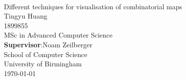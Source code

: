 




 


\begin{titlepage}
	\mbox{}\vspace{5\baselineskip}\\
	\sffamily\huge
	\centering
	Different techniques for visualisation of combinatorial maps
	\vspace{3\baselineskip}\\
	\rmfamily\Large
	Tingyu Huang \\ 1899855\\MSc in Advanced Computer Science
	\vspace{2\baselineskip}\\
	\rmfamily\Large
   \textbf{Supervisor}:Noam Zeilberger
   \vspace{1\baselineskip}\\
	School of Computer Science\\University of Birmingham
	\vspace{1\baselineskip}\\
	\today
\end{titlepage}

% 
